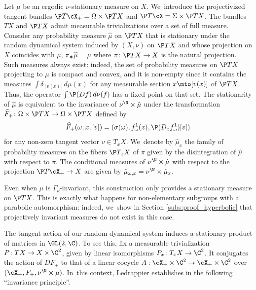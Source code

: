 Let $\mu$ be an ergodic $\nu$-stationary measure on $X$. We~introduce the projectivized tangent bundles $\P T \cX_+ = \Omega \times \P TX$ and $\P T\cX = \Sigma\times \P TX$. The bundles $TX$ and $\P TX$ admit measurable trivializations over a set of full measure.
Consider any probability measure $\hat\mu$ on $\P TX$ that is stationary under the random dynamical system induced by $(X,\nu)$ on $\P TX$
and whose projection on $X$ coincides with $\mu$, \ie $\pi_\varstar \hat\mu= \mu $ where $\pi\colon \P TX\to X$ is the natural projection.
Such measures always exist: indeed,
the set of probability measures on $\P TX$ projecting to $\mu$ is compact and convex, and it is non-empty since it contains
the measures $\int \delta_{[v(x)]} d\mu(x)$ for any measurable section
$x\mto [v(x)]$ of $\P TX$. Thus, the operator $\int \P (Df) \,d\nu(f)$ has a fixed point on that set. The stationarity of $\hat\mu$ is equivalent to the invariance of $\nu^\N\times \hat\mu$
under the transformation ${\widehat{F}_+}\colon \Omega\times \P TX\to \Omega\times \P TX$ defined by
\begin{equation*}
{\widehat{F}_+}(\omega, x, [v])= (\sigma(\omega), f^1_\omega(x), \P(D_xf^1_\omega)[v])
\end{equation*}
for any non-zero tangent vector $v\in T_xX$. We~denote by $\hat\mu_x$ the family of probability measures
on the fibers $\P T_x X$ of $\pi$
given by the disintegration of $\hat\mu$ with respect to $\pi$.
The conditional measures of $\nu^\N\times\hat\mu$ with respect to the projection
$\P T\cX_+\to X$ are given by $\hat\mu_{\omega,x} = \nu^\N\times \hat\mu_x$.

\begin{rem}
Even when $\mu$ is $\Gamma_\nu$-invariant, this construction only provides a stationary measure on
$\P TX$. This is exactly what happens for non-elementary subgroups with a parabolic automorphism:
indeed, we~show in Section \ref{subs:proof_hyperbolic} that projectively invariant measures do not exist in this case.
\end{rem}

The tangent action of our random dynamical system induces a stationary product of
matrices in $\GL(2, \C)$. To see this, fix a measurable trivialization $P\colon TX\to X\times \C^2$, given
by linear isomorphisms $P_x\colon T_xX\to \C^2$. It conjugates the action of $DF_+$ to that of a linear
cocycle $A:\cX_+ \times \C^2\to \cX_+ \times \C^2$ over $(\cX_+, F_+, \nu^\N\times \mu)$. In~this context,
Ledrappier establishes in \cite{ledrappier_stationary}
the following ``invariance principle''.

